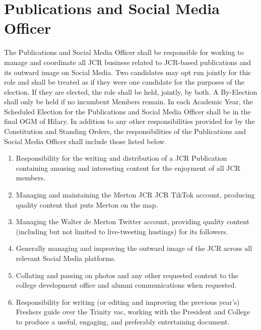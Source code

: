 \section{Publications and Social Media Officer}
\npara The Publications and Social Media Officer shall be responsible for working to manage and coordinate all JCR business related to JCR-based publications and its outward image on Social Media. 
\npara Two candidates may opt run jointly for this role and shall be treated as if they were one candidate for the purposes of the election. If they are elected, the role shall be held, jointly, by both. A By-Election shall only be held if no incumbent Members remain.
\npara In each Academic Year, the Scheduled Election for the Publications and Social Media Officer shall be in the final OGM of Hilary.
\npara In addition to any other responsibilities provided for by the Constitution and Standing Orders, the responsibilities of the Publications and Social Media Officer shall include those listed below.
\begin{enumerate}
	\item Responsibility for the writing and distribution of a JCR Publication containing amusing and interesting content for the enjoyment of all JCR members.
	\item Managing and maintaining the Merton JCR JCR TikTok account, producing quality content that puts Merton on the map.
	\item Managing the Walter de Merton Twitter account, providing quality content (including but not limited to live-tweeting hustings) for its followers.
	\item Generally managing and improving the outward image of the JCR across all relevant Social Media platforms.
	\item Collating and passing on photos and any other requested content to the college development office and alumni communications when requested.
	\item Responsibility for writing (or editing and improving the previous year's) Freshers guide over the Trinity vac, working with the President and College to produce a useful, engaging, and preferably entertaining document.
\end{enumerate}
